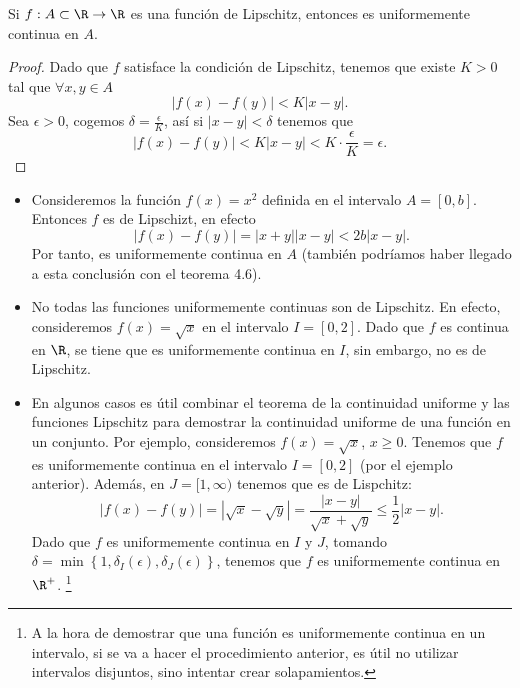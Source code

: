 \begin{ftheorem}[]
\normalfont Si $\displaystyle f : A \subset \R \to \R $ es una función de Lipschitz, entonces es uniformemente continua en $\displaystyle A $.
\end{ftheorem}
\begin{proof}
Dado que $\displaystyle f $ satisface la condición de Lipschitz, tenemos que existe $\displaystyle K > 0 $ tal que $\displaystyle \forall x,y \in A $ 
\[ \left|f\left(x\right)-f\left(y\right)\right| < K \left|x -y\right| .\]
Sea $\displaystyle \epsilon > 0 $, cogemos $\displaystyle \delta = \frac{\epsilon }{K} $, así si $\displaystyle \left|x - y\right| < \delta  $ tenemos que
\[ \left|f\left(x\right)-f\left(y\right)\right| < K \left|x-y\right| < K \cdot \frac{\epsilon }{K}= \epsilon .\]
\end{proof}
\begin{eg}
\normalfont 
\begin{itemize}
	\item Consideremos la función $\displaystyle f\left(x\right) = x^{2} $ definida en el intervalo $\displaystyle A = [0,b] $. Entonces $\displaystyle f $ es de Lipschizt, en efecto
		\[ \left|f\left(x\right)-f\left(y\right)\right| = \left|x + y\right| \left|x -y\right| < 2b \left|x-y\right| .\]
	Por tanto, es uniformemente continua en $\displaystyle A $ (también podríamos haber llegado a esta conclusión con el teorema 4.6).
\item No todas las funciones uniformemente continuas son de Lipschitz. En efecto, consideremos $\displaystyle f\left(x\right) = \sqrt{x} $ en el intervalo $\displaystyle I = [0,2] $. Dado que $\displaystyle f $ es continua en $\displaystyle \R $, se tiene que es uniformemente continua en $\displaystyle I $, sin embargo, no es de Lipschitz.
\item En algunos casos es útil combinar el teorema de la continuidad uniforme y las funciones Lipschitz para demostrar la continuidad uniforme de una función en un conjunto. Por ejemplo, consideremos $\displaystyle f\left(x\right) = \sqrt{x} $, $\displaystyle x \geq 0 $. Tenemos que $\displaystyle f $ es uniformemente continua en el intervalo $\displaystyle I =[0,2] $ (por el ejemplo anterior). Además, en $\displaystyle J =[1,\infty) $ tenemos que es de Lispchitz:
	\[ \left|f\left(x\right)-f\left(y\right)\right| = \left|\sqrt{x}-\sqrt{y}\right| = \frac{ \left|x-y\right|}{\sqrt{x}+\sqrt{y}} \leq \frac{1}{2} \left|x -y\right| .\]
	Dado que $\displaystyle f $ es uniformemente continua en $\displaystyle I $ y $\displaystyle J $, tomando $\displaystyle \delta = \min \left\{ 1, \delta_{I}\left(\epsilon \right), \delta _{J}\left(\epsilon \right)\right\}  $, tenemos que $\displaystyle f $ es uniformemente continua en $\displaystyle \R^{+} $. \footnote{A la hora de demostrar que una función es uniformemente continua en un intervalo, si se va a hacer el procedimiento anterior, es útil no utilizar intervalos disjuntos, sino intentar crear solapamientos.} 
\end{itemize}
\end{eg}
